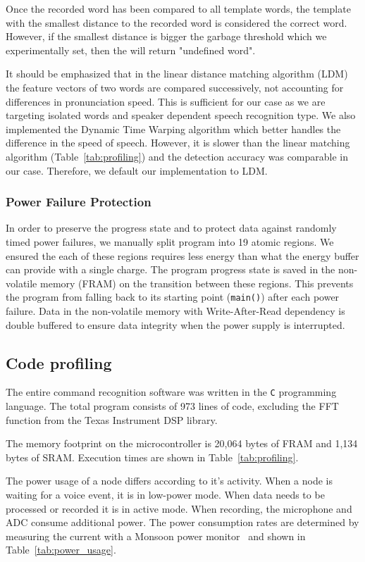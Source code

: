 Once the recorded word has been compared to all \cim template words, the template with the smallest distance to the recorded word is considered the correct word. However, if the smallest distance is bigger the garbage threshold which we experimentally set, then the \cim will return "undefined word". 

It should be emphasized that in the linear distance matching algorithm (LDM) the feature vectors of two words are compared successively, not accounting for differences in pronunciation speed. This is sufficient for our case as we are targeting isolated words and speaker dependent speech recognition type. We also implemented the Dynamic Time Warping algorithm which better handles the difference in the speed of speech. However, it is slower than the linear matching algorithm  (Table~\ref{tab:profiling}) and the detection accuracy was comparable in our case. Therefore, we default our implementation to LDM. 

\subsubsection{Power Failure Protection}
In order to preserve the progress state and to protect \cim data against randomly timed power failures, we manually split \cim program into 19 atomic regions. We ensured the each of these regions requires less energy than what the energy buffer can provide with a single charge. The program progress state is saved in the non-volatile memory (FRAM) on the transition between these regions. This prevents the program from falling back to its starting point (\texttt{main()}) after each power failure. Data in the non-volatile memory with Write-After-Read dependency is double buffered to ensure data integrity when the power supply is interrupted. 

\subsection{Code profiling}
The entire command recognition software was written in the {\tt C} programming language. The total program consists of 973 lines of code, excluding the FFT function from the Texas Instrument DSP library.

The memory footprint on the microcontroller is 20,064 bytes of FRAM and 1,134 bytes of SRAM. Execution times are shown in Table~\ref{tab:profiling}.

The power usage of a node differs according to it's activity. When a node is waiting for a voice event, it is in low-power mode. When data needs to be processed or recorded it is in active mode. When recording, the microphone and ADC consume additional power. The power consumption rates are determined by measuring the current with a Monsoon power monitor~\cite{monsoon} and shown in Table~\ref{tab:power_usage}.


